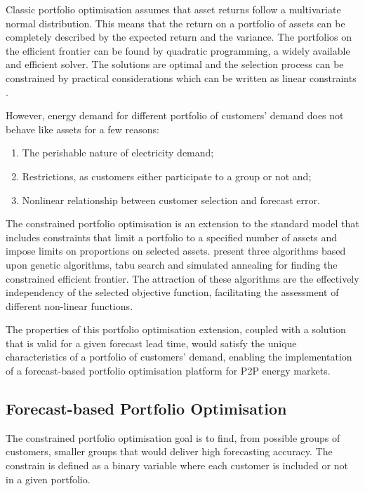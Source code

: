 \documentclass[review, 3p, 12pt, authoryear]{elsarticle}
\begin{document}
Classic portfolio optimisation assumes that asset returns follow a multivariate normal distribution.
This means that the return on a portfolio of assets can be completely described by the expected return and the variance.
The portfolios on the efficient frontier can be found by quadratic programming, a widely available and efficient solver.
The solutions are optimal and the selection process can be constrained by practical considerations which can be written as linear constraints \citep{CHANG20001271}.

However, energy demand for different portfolio of customers' demand does not behave like assets for a few reasons:
\begin{enumerate}
   \item The perishable nature of electricity demand;
   \item Restrictions, as customers either participate to a group or not and;
   \item Nonlinear relationship between customer selection and forecast error.
\end{enumerate}

The constrained portfolio optimisation is an extension to the standard model that includes constraints that limit a portfolio to a specified number of assets and impose limits on proportions on selected assets.
\citet{CHANG20001271} present three algorithms based upon genetic algorithms, tabu search and simulated annealing for finding the constrained efficient frontier.
The attraction of these algorithms are the effectively independency of the selected objective function, facilitating the assessment of different non-linear functions.

The properties of this portfolio optimisation extension, coupled with a solution that is valid for a given forecast lead time, would satisfy the unique characteristics of a portfolio of customers' demand, enabling the implementation of a forecast-based portfolio optimisation platform for P2P energy markets.

\subsection{Forecast-based Portfolio Optimisation}
\label{ss:portopt}

The constrained portfolio optimisation goal is to find, from possible groups of customers, smaller groups that would deliver high forecasting accuracy.
The constrain is defined as a binary variable where each customer is included or not in a given portfolio.
\end{document}
